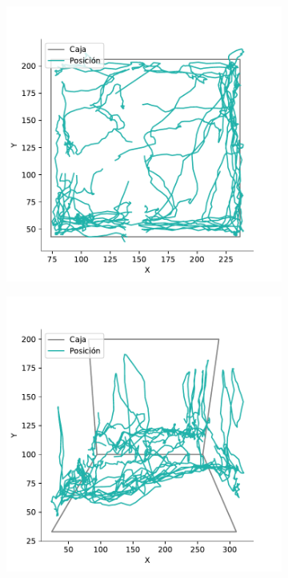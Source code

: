 \begin{figure}[]
\begin{subfigure}{0.45\textwidth}
    \caption{}
    \label{fig:raw-top}
  \end{subfigure}
  \begin{subfigure}{0.45\textwidth}
    \centering
    \includegraphics[width=\textwidth]{figures/filtered-trayectory-top-4128-2020-12-02.pdf}
    \caption{}
  \end{subfigure}
  \begin{subfigure}{0.45\textwidth}
    \centering
    \includegraphics[width=\textwidth]{figures/filtered-trayectory-lateral-4128-2020-12-02.pdf}

\end{subfigure}
\end{figure}

